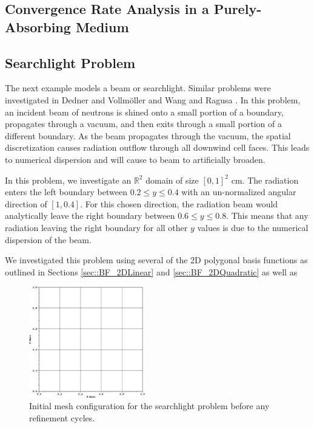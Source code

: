 \subsection{Convergence Rate Analysis in a Purely-Absorbing Medium}
\label{sec::BF_Results_PA}



\subsection{Searchlight Problem}
\label{sec::BF_Results_SL}

The next example models a beam or searchlight. Similar problems were investigated in Dedner and Vollm{\"o}ller \cite{dedner2002adaptive} and Wang and Ragusa \cite{wang2011standard}. In this problem, an incident beam of neutrons is shined onto a small portion of a boundary, propagates through a vacuum, and then exits through a small portion of a different boundary. As the beam propagates through the vacuum, the spatial discretization causes radiation outflow through all downwind cell faces. This leads to numerical dispersion and will cause to beam to artificially broaden.

In this problem, we investigate an $\mathbb{R}^2$ domain of size $[0,1]^2$ cm. The radiation enters the left boundary between $0.2 \leq y \leq 0.4$ with an un-normalized angular direction of $[1,0.4]$. For this chosen direction, the radiation beam would analytically leave the right boundary between $0.6 \leq y \leq 0.8$. This means that any radiation leaving the right boundary for all other $y$ values is due to the numerical dispersion of the beam.

We investigated this problem using several of the 2D polygonal basis functions as outlined in Sections \ref{sec::BF_2DLinear} and \ref{sec::BF_2DQuadratic} as well as 

\begin{figure}
\centering
\includegraphics[width=0.45\textwidth]{figures/sec_BF/searchlight_starting_mesh.eps}
\caption{Initial mesh configuration for the searchlight problem before any refinement cycles.}
\label{fig::BF_Results_SL_starting_mesh}
\end{figure}

